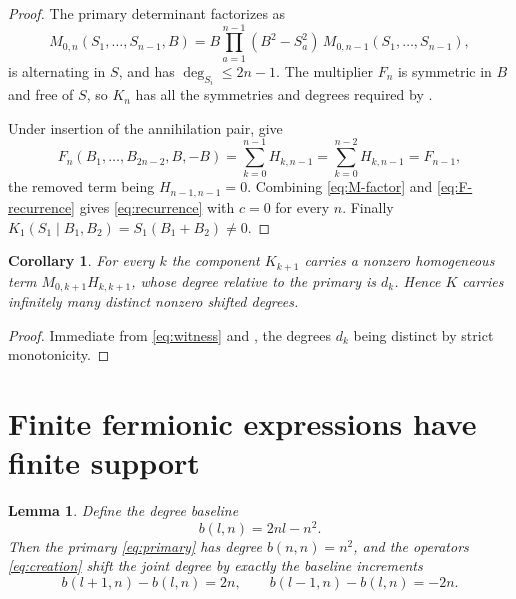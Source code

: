 \documentclass[11pt,reqno]{amsart}
\theoremstyle{plain}
\newtheorem{lemma}[theorem]{Lemma}
\newtheorem{corollary}[theorem]{Corollary}
\theoremstyle{definition}
\theoremstyle{remark}
\numberwithin{equation}{section}
\begin{document}
\begin{proof}
  The primary determinant factorizes as
  \begin{equation}
    \label{eq:M-factor}
    M_{0,n}(S_1,\dots,S_{n-1},B)
    =B\prod_{a=1}^{n-1}(B^2-S_a^2)\,M_{0,n-1}(S_1,\dots,S_{n-1}),
  \end{equation}
  is alternating in $S$, and has $\deg_{S_i}\le2n-1$. The multiplier $F_n$
  is symmetric in $B$ and free of $S$, so $K_n$ has all the symmetries and
  degrees required by .

  Under insertion of the annihilation pair, 
  give
  \begin{equation}
    \label{eq:F-recurrence}
    F_n(B_1,\dots,B_{2n-2},B,-B)
    =\sum_{k=0}^{n-1}H_{k,n-1}
    =\sum_{k=0}^{n-2}H_{k,n-1}
    =F_{n-1},
  \end{equation}
  the removed term being $H_{n-1,n-1}=0$. Combining
  \eqref{eq:M-factor} and \eqref{eq:F-recurrence} gives
  \eqref{eq:recurrence} with $c=0$ for every $n$. Finally
  $K_1(S_1\mid B_1,B_2)=S_1(B_1+B_2)\ne0$.
\end{proof}

\begin{corollary}
  \label{cor:support}
  For every $k$ the component $K_{k+1}$ carries a nonzero homogeneous term
  $M_{0,k+1}H_{k,k+1}$, whose degree relative to the primary is $d_k$. Hence
  $K$ carries infinitely many distinct nonzero shifted degrees.
\end{corollary}

\begin{proof}
  Immediate from \eqref{eq:witness} and , the degrees $d_k$
  being distinct by strict monotonicity.
\end{proof}

\section{Finite fermionic expressions have finite support}
\label{sec:finite-support}

\begin{lemma}
  \label{lem:baseline}
  Define the degree baseline
  \begin{equation}
    \label{eq:baseline}
    b(l,n)=2nl-n^2 .
  \end{equation}
  Then the primary \eqref{eq:primary} has degree $b(n,n)=n^2$, and the
  operators \eqref{eq:creation} shift the joint degree by exactly the
  baseline increments
  \begin{equation}
    \label{eq:increments}
    b(l+1,n)-b(l,n)=2n,
    \qquad
    b(l-1,n)-b(l,n)=-2n .
  \end{equation}
\end{lemma}
\end{document}
